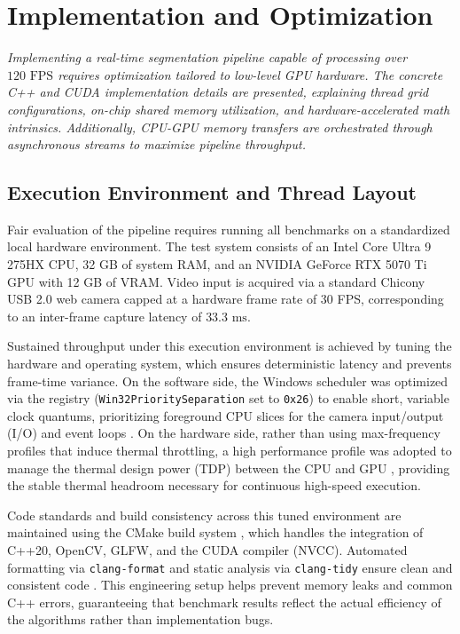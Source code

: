\chapter{Implementation and Optimization}\label{chap:4}
{\itshape Implementing a real-time segmentation pipeline capable of processing over $120\text{ FPS}$ requires optimization tailored to low-level GPU hardware. The concrete C++ and CUDA implementation details are presented, explaining thread grid configurations, on-chip shared memory utilization, and hardware-accelerated math intrinsics. Additionally, CPU-GPU memory transfers are orchestrated through asynchronous streams to maximize pipeline throughput.}

\section{Execution Environment and Thread Layout}
Fair evaluation of the pipeline requires running all benchmarks on a standardized local hardware environment. The test system consists of an Intel Core Ultra 9 275HX CPU, 32 GB of system RAM, and an NVIDIA GeForce RTX 5070 Ti GPU with 12 GB of VRAM. Video input is acquired via a standard Chicony USB 2.0 web camera capped at a hardware frame rate of 30 FPS, corresponding to an inter-frame capture latency of $33.3\text{ ms}$.

Sustained throughput under this execution environment is achieved by tuning the hardware and operating system, which ensures deterministic latency and prevents frame-time variance. On the software side, the Windows scheduler was optimized via the registry (\texttt{Win32PrioritySeparation} set to \texttt{0x26}) to enable short, variable clock quantums, prioritizing foreground CPU slices for the camera input/output (I/O) and event loops \cite{microsoft_priority_separation_official, intel_thermal_ultra_gen}. On the hardware side, rather than using max-frequency profiles that induce thermal throttling, a high performance profile was adopted to manage the thermal design power (TDP) between the CPU and GPU \cite{intel_thermal_ultra_gen}, providing the stable thermal headroom necessary for continuous high-speed execution.

Code standards and build consistency across this tuned environment are maintained using the CMake build system \cite{cmake_official}, which handles the integration of C++20, OpenCV, GLFW, and the CUDA compiler (NVCC). Automated formatting via \texttt{clang-format} and static analysis via \texttt{clang-tidy} ensure clean and consistent code \cite{clang_tools}. This engineering setup helps prevent memory leaks and common C++ errors, guaranteeing that benchmark results reflect the actual efficiency of the algorithms rather than implementation bugs.

